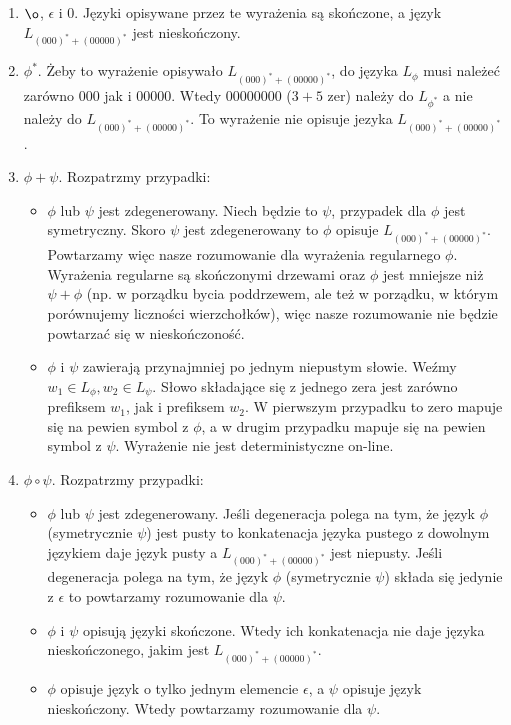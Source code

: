 \documentclass[a4paper]{article}
\begin{document}
\begin{enumerate}
\item $\o$, $\epsilon$ i $0$. Języki opisywane przez te wyrażenia są skończone, a język $L_{(000)^* + (00000)^*}$ jest nieskończony.
\item $\phi^*$. Żeby to wyrażenie opisywało $L_{(000)^* + (00000)^*}$, do języka $L_{\phi}$ musi należeć zarówno $000$ jak i $00000$. Wtedy $00000000$ ($3+5$ zer) należy do $L_{\phi^*}$ a nie należy do $L_{(000)^* + (00000)^*}$. To wyrażenie nie opisuje jezyka $L_{(000)^* + (00000)^*}$.
\item $\phi + \psi$. Rozpatrzmy przypadki:
  \begin{itemize}
    \item $\phi$ lub $\psi$ jest zdegenerowany. Niech będzie to $\psi$, przypadek dla $\phi$ jest symetryczny. Skoro $\psi$ jest zdegenerowany to $\phi$ opisuje $L_{(000)^* + (00000)^*}$. Powtarzamy więc nasze rozumowanie dla wyrażenia regularnego $\phi$. Wyrażenia regularne są skończonymi drzewami oraz $\phi$ jest mniejsze niż $\psi + \phi$ (np. w porządku bycia poddrzewem, ale też w porządku, w którym porównujemy liczności wierzchołków), więc nasze rozumowanie nie będzie powtarzać się w nieskończoność.
    \item $\phi$ i $\psi$ zawierają przynajmniej po jednym niepustym słowie. Weźmy $w_1 \in L_{\phi}, w_2 \in L_{\psi}$. Słowo składające się z jednego zera jest zarówno prefiksem $w_1$, jak i prefiksem $w_2$. W pierwszym przypadku to zero mapuje się na pewien symbol z $\phi$, a w drugim przypadku mapuje się na pewien symbol z $\psi$. Wyrażenie nie jest deterministyczne on-line.
  \end{itemize}
\item $\phi \circ \psi$. Rozpatrzmy przypadki:
  \begin{itemize}
  \item $\phi$ lub $\psi$ jest zdegenerowany. Jeśli degeneracja polega na tym, że język $\phi$ (symetrycznie $\psi$) jest pusty to konkatenacja języka pustego z dowolnym językiem daje język pusty a $L_{(000)^* + (00000)^*}$ jest niepusty. Jeśli degeneracja polega na tym, że język $\phi$ (symetrycznie $\psi$) składa się jedynie z $\epsilon$ to powtarzamy rozumowanie dla $\psi$.
    \item $\phi$ i $\psi$ opisują języki skończone. Wtedy ich konkatenacja nie daje języka nieskończonego, jakim jest $L_{(000)^* + (00000)^*}$.
    \item $\phi$ opisuje język o tylko jednym elemencie $\epsilon$, a $\psi$ opisuje język nieskończony. Wtedy powtarzamy rozumowanie dla $\psi$.

\end{itemize}
\end{enumerate}
\end{document}
